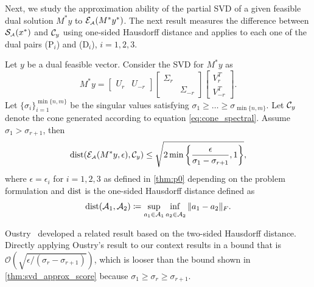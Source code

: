 Next, we study the approximation ability of the partial SVD of a given feasible dual solution $M^* y$ to $\mathcal{E}_{\scriptscriptstyle\mathcal{A}}(M^* y^*)$. The next result measures the difference between $\operatorname{\mathcal{S}_{\scriptscriptstyle\mathcal{A}}}(x^*)$ and $\mathcal{C}_y$ using one-sided Hausdorff distance and applies to each one of the dual pairs (P$_i$) and (D$_i$), $i=1,2,3$.

\begin{proposition} \label{thm:svd_approx_score}
    Let $y$ be a dual feasible vector. Consider the SVD for $M^*y$ as 
    \[ M^*y = 
  \begin{bmatrix}
      U_r & U_{-r}
  \end{bmatrix}
  \begin{bmatrix}
      \Sigma_r &          \\ 
               &  \Sigma_{-r}
  \end{bmatrix}
  \begin{bmatrix}
      V_r^T \\ 
      V_{-r}^T
  \end{bmatrix}.
  \] 
  Let $\{\sigma_i\}_{i=1}^{\min\{n,m\}}$ be the singular values satisfying 
  $\sigma_1 \geq \dots \geq \sigma_{\min\{n,m\}}$.
  Let $\mathcal{C}_y$ denote the cone generated according to equation \eqref{eq:cone_spectral}. Assume $\sigma_1 > \sigma_{r+1}$, then 
    \[
      \operatorname{dist}( \mathcal{E}_{\scriptscriptstyle\mathcal{A}}( M^* y, \epsilon ), \mathcal{C}_y  ) \leq \sqrt{ 2 \min\left\{ \frac{\epsilon}{ \sigma_1 - \sigma_{r+1} }, 1 \right\} },
    \]
    where $\epsilon = \epsilon_i$ for $i = 1, 2, 3$ as defined in \autoref{thm:p0} depending on the problem formulation and $\operatorname{dist}$ is the one-sided Hausdorff distance defined as 
    \[  
    \dist( \Ascr_1, \Ascr_2 ) \coloneqq \adjustlimits\sup_{a_1 \in \Ascr_1} \inf_{a_2 \in \Ascr_2 } \| a_1 - a_2 \|_F.
      \]
\end{proposition}

Oustry~\cite[Theorem~2.11]{Oustry00} developed a related result based on the two-sided Hausdorff distance. Directly applying Oustry's result to our context results in a bound that is $ \mathcal{O}( \sqrt{ \epsilon/( \sigma_r - \sigma_{r+1} ) } ) $, which is looser than the bound shown in \autoref{thm:svd_approx_score} because $\sigma_1 \geq \sigma_{r} \geq \sigma_{r+1}$. 

